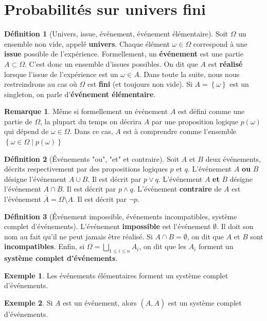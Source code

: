 \documentclass[french]{book}
\newcommand{\tq}{\middle|}
\theoremstyle{plain}
\theoremstyle{definition}
\newtheorem{dfn}{Définition}[chapter]
\newtheorem{exa}{Exemple}[chapter]
\newtheorem{rmq}{Remarque}[chapter]
\theoremstyle{remark}
\begin{document}
\section{Probabilités sur univers fini}
\begin{dfn}[Univers, issue, événement, événement élémentaire]
	Soit $\Omega$ un ensemble non vide, appelé \textbf{univers}. Chaque élément $\omega\in\Omega$ correspond à une \textbf{issue} possible de l'expérience. Formellement, un \textbf{événement} est une partie $A\subset \Omega$. C'est donc un ensemble d'issues possibles. On dit que $A$ est \textbf{réalisé} lorsque l'issue de l'expérience est un $\omega\in A$. Dans toute la suite, nous nous restreindrons au cas où $\Omega$ est \textbf{fini} (et toujours non vide). Si $A=\left\{\omega\right\}$ est un singleton, on parle d'\textbf{événement élémentaire}.
\end{dfn}
\begin{rmq} Même si formellement un événement $A$ est défini comme une partie de $\Omega$, la plupart du temps on décrira $A$ par une proposition logique $p(\omega)$ qui dépend de $\omega\in\Omega$. Dans ce cas, $A$ est à comprendre comme l'ensemble $\left\{\omega\in\Omega\tq p(\omega)\right\}$ \end{rmq}
\begin{dfn}[Événements "ou", "et" et contraire]
	Soit $A$ et $B$ deux événements, décrits respectivement par des propositions logiques $p$ et $q$. L'événement $A$ \textbf{ou} $B$ désigne l'événement $A\cup B$. Il est décrit par $p\lor q$. L'événement $A$ \textbf{et} $B$ désigne l'événement $A\cap B$. Il est décrit par $p\land q$. L'événement \textbf{contraire} de $A$ est l'événement $\overline{A}=\Omega\setminus A$. Il est décrit par $\lnot p$.
\end{dfn}
\begin{dfn}[Événement impossible, événements incompatibles, système complet d'événements]
	L'événement \textbf{impossible} est l'événement $\emptyset$. Il doit son nom au fait qu'il ne peut jamais être réalisé. Si $A\cap B=\emptyset$, on dit que $A$ et $B$ sont \textbf{incompatibles}. Enfin, si $\displaystyle\Omega=\bigsqcup_{1\leqslant i\leqslant n} A_i$, on dit que les $A_i$ forment un \textbf{système complet d'événements}.
\end{dfn}
\begin{exa}
	Les événements élémentaires forment un système complet d'événements.
\end{exa}
\begin{exa}
	Si $A$ est un événement, alors $(A,\overline{A})$ est un système complet d'événements.
\end{exa}
\end{document}

